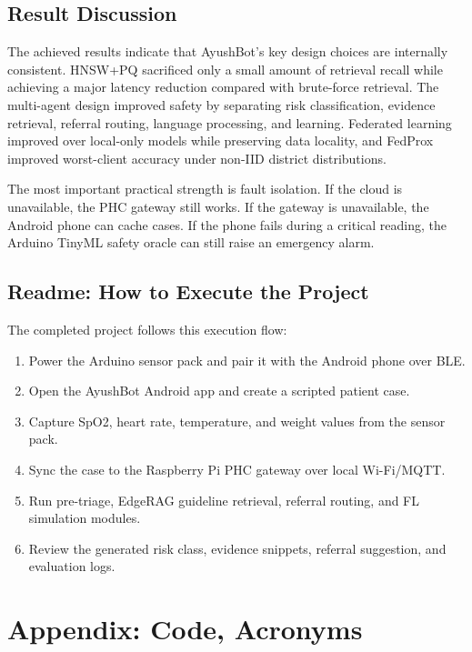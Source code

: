 \documentclass[12pt,a4paper,openany]{report}
\begin{document}
\section{Result Discussion}
The achieved results indicate that AyushBot's key design choices are internally consistent. HNSW+PQ sacrificed only a small amount of retrieval recall while achieving a major latency reduction compared with brute-force retrieval. The multi-agent design improved safety by separating risk classification, evidence retrieval, referral routing, language processing, and learning. Federated learning improved over local-only models while preserving data locality, and FedProx improved worst-client accuracy under non-IID district distributions.

The most important practical strength is fault isolation. If the cloud is unavailable, the PHC gateway still works. If the gateway is unavailable, the Android phone can cache cases. If the phone fails during a critical reading, the Arduino TinyML safety oracle can still raise an emergency alarm.

\section{Readme: How to Execute the Project}
The completed project follows this execution flow:
\begin{enumerate}
  \item Power the Arduino sensor pack and pair it with the Android phone over BLE.
  \item Open the AyushBot Android app and create a scripted patient case.
  \item Capture SpO2, heart rate, temperature, and weight values from the sensor pack.
  \item Sync the case to the Raspberry Pi PHC gateway over local Wi-Fi/MQTT.
  \item Run pre-triage, EdgeRAG guideline retrieval, referral routing, and FL simulation modules.
  \item Review the generated risk class, evidence snippets, referral suggestion, and evaluation logs.
\end{enumerate}

\chapter*{Appendix: Code, Acronyms}
\end{document}
